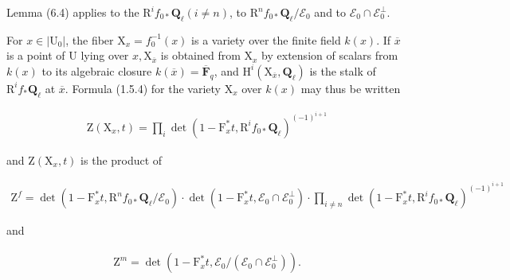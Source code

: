 \documentclass[10pt,leqno]{article}
\begin{document}
\noindent Lemma (6.4) applies to the \(\mathrm{R}^{i} f_{0*}\mathbf{Q}_{\ell } (i\ne n)\), to \(\mathrm{R}^{n} f_{0*}\mathbf{Q}_{\ell }/\mathcal{E} _{0}\) and to \(\mathcal{E} _{0}\cap \mathcal{E} _{0}^{\perp }\).\par

\noindent For \(x\in |\mathrm{U}_{0}|\), the fiber \(\mathrm{X}_{x}=f_{0}^{- 1}(x)\) is a variety over the finite field \(k(x)\). If \(\overline{x}\) is a point of \(\mathrm{U}\) lying over \(x, \mathrm{X}_{\overline{x}}\) is obtained from \(\mathrm{X}_{x}\) by extension of scalars from \(k(x)\) to its algebraic closure \(k(\overline{x})=\overline{\mathbf{F}}_{q}\), and \(\mathrm{H}^{i}(\mathrm{X}_{\overline{x}},\mathbf{Q}_{\ell })\) is the stalk of \(\mathrm{R}^{i} f_{*}\mathbf{Q}_{\ell }\) at \(\overline{x}\). Formula (1.5.4) for the variety \(\mathrm{X}_{x}\) over \(k(x)\) may thus be written\par

\begin{equation*}\begin{gathered}\mathrm{Z}(\mathrm{X}_{x},t)=\prod _{i} \operatorname{det}(1- \mathrm{F}_{x}^{*}t,\mathrm{R}^{i} f_{0*}\mathbf{Q}_{\ell })^{(- 1)^{i+1}}\end{gathered}\end{equation*}

\noindent and \(\mathrm{Z}(\mathrm{X}_{x},t)\) is the product of\par

\begin{equation*}\begin{gathered}\mathrm{Z}^{f}=\operatorname{det}(1- \mathrm{F}_{x}^{*}t,\mathrm{R}^{n} f_{0*}\mathbf{Q}_{\ell }/\mathcal{E} _{0})\cdot \operatorname{det}(1- \mathrm{F}_{x}^{*}t,\mathcal{E} _{0}\cap \mathcal{E} _{0}^{\perp })\cdot \prod _{i\ne n}\operatorname{det}(1- \mathrm{F}_{x}^{*}t,\mathrm{R}^{i} f_{0*}\mathbf{Q}_{\ell })^{(- 1)^{i+1}}\end{gathered}\end{equation*}

\noindent and\par

\begin{equation*}\begin{gathered}\mathrm{Z}^{m}=\operatorname{det}(1- \mathrm{F}_{x}^{*}t,\mathcal{E} _{0}/(\mathcal{E} _{0}\cap \mathcal{E} _{0}^{\perp })).\end{gathered}\end{equation*}
\end{document}
